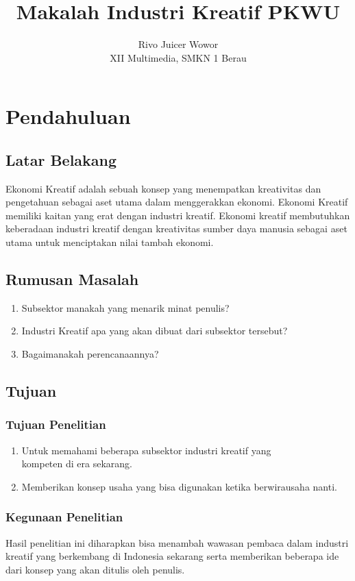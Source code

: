 \documentclass[12pt,a4paper]{report}
\title{Makalah Industri Kreatif PKWU}
\author{Rivo Juicer Wowor\\ XII Multimedia, SMKN 1 Berau}
\date{}
\begin{document}
    \maketitle

    \chapter{Pendahuluan}
    \section{Latar Belakang}
    \par Ekonomi Kreatif adalah sebuah konsep yang menempatkan kreativitas dan pengetahuan sebagai aset utama dalam menggerakkan ekonomi. Ekonomi Kreatif memiliki kaitan yang erat dengan industri kreatif. Ekonomi kreatif membutuhkan keberadaan industri kreatif dengan kreativitas sumber daya manusia sebagai aset utama untuk menciptakan nilai tambah ekonomi.
    \section{Rumusan Masalah}
    \begin{enumerate}
        \item Subsektor manakah yang menarik minat penulis?
        \item Industri Kreatif apa yang akan dibuat dari subsektor tersebut?
        \item Bagaimanakah perencanaannya?
    \end{enumerate}
    \section{Tujuan}
    \subsection{Tujuan Penelitian}
    \begin{enumerate}
        \item Untuk memahami beberapa subsektor industri kreatif yang\\kompeten di era sekarang.
        \item Memberikan konsep usaha yang bisa digunakan ketika berwirausaha nanti.
    \end{enumerate}
    \subsection{Kegunaan Penelitian}
    Hasil penelitian ini diharapkan bisa menambah wawasan pembaca dalam industri kreatif yang berkembang di Indonesia sekarang serta memberikan beberapa ide dari konsep yang akan ditulis oleh penulis.
\end{document}
